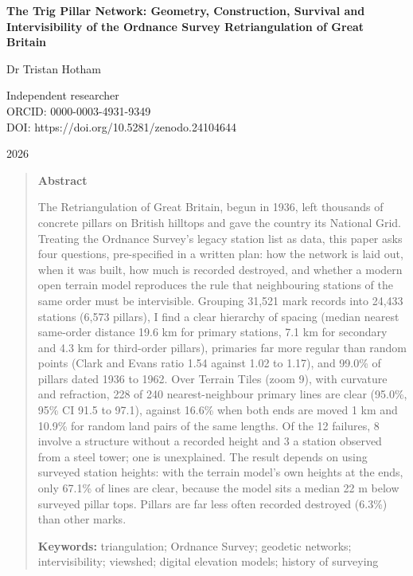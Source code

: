 \documentclass[11pt,a4paper]{article}
\begin{document}
\begin{center}
{\Large\bfseries The Trig Pillar Network: Geometry, Construction, Survival and Intervisibility of the Ordnance Survey Retriangulation of Great Britain\par}
\vspace{1.2em}
{\large Dr Tristan Hotham\par}
\vspace{0.3em}
{\small Independent researcher\\
ORCID: 0000-0003-4931-9349\\
DOI: https://doi.org/10.5281/zenodo.24104644\par}
\vspace{0.8em}
2026
\end{center}

\begin{quote}
\small
\begin{center}\textbf{Abstract}\end{center}
The Retriangulation of Great Britain, begun in 1936, left thousands of concrete pillars on British hilltops and gave the country its National Grid. Treating the Ordnance Survey's legacy station list as data, this paper asks four questions, pre-specified in a written plan: how the network is laid out, when it was built, how much is recorded destroyed, and whether a modern open terrain model reproduces the rule that neighbouring stations of the same order must be intervisible. Grouping 31,521 mark records into 24,433 stations (6,573 pillars), I find a clear hierarchy of spacing (median nearest same-order distance 19.6 km for primary stations, 7.1 km for secondary and 4.3 km for third-order pillars), primaries far more regular than random points (Clark and Evans ratio 1.54 against 1.02 to 1.17), and 99.0\% of pillars dated 1936 to 1962. Over Terrain Tiles (zoom 9), with curvature and refraction, 228 of 240 nearest-neighbour primary lines are clear (95.0\%, 95\% CI 91.5 to 97.1), against 16.6\% when both ends are moved 1 km and 10.9\% for random land pairs of the same lengths. Of the 12 failures, 8 involve a structure without a recorded height and 3 a station observed from a steel tower; one is unexplained. The result depends on using surveyed station heights: with the terrain model's own heights at the ends, only 67.1\% of lines are clear, because the model sits a median 22 m below surveyed pillar tops. Pillars are far less often recorded destroyed (6.3\%) than other marks.

\textbf{Keywords:} triangulation; Ordnance Survey; geodetic networks; intervisibility; viewshed; digital elevation models; history of surveying
\end{quote}
\end{document}
